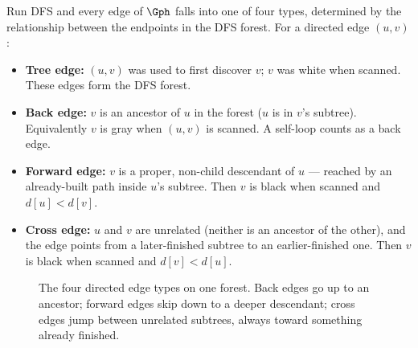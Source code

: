 Run DFS and every edge of $\Gph$ falls into one of four types, determined by the relationship between the endpoints in the DFS forest. For a directed edge $(u,v)$:

\begin{itemize}
  \item \textbf{Tree edge:} $(u,v)$ was used to first discover $v$; $v$ was white when scanned. These edges form the DFS forest.
  \item \textbf{Back edge:} $v$ is an ancestor of $u$ in the forest ($u$ is in $v$'s subtree). Equivalently $v$ is gray when $(u,v)$ is scanned. A self-loop counts as a back edge.
  \item \textbf{Forward edge:} $v$ is a proper, non-child descendant of $u$ --- reached by an already-built path inside $u$'s subtree. Then $v$ is black when scanned and $d[u]<d[v]$.
  \item \textbf{Cross edge:} $u$ and $v$ are unrelated (neither is an ancestor of the other), and the edge points from a later-finished subtree to an earlier-finished one. Then $v$ is black when scanned and $d[v]<d[u]$.
\end{itemize}

\begin{figure}[H]
\centering
{}
\caption{The four directed edge types on one forest. Back edges go up to an ancestor; forward edges skip down to a deeper descendant; cross edges jump between unrelated subtrees, always toward something already finished.}
\label{ch03:fig-edgetypes}
\end{figure}

